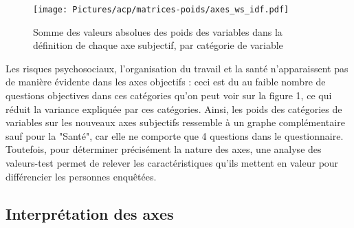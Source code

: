 \documentclass[11pt,fleqn,a4paper,openany,frenchb]{book} %
\begin{document}
\begin{figure}[!h]
  \centering
  \texttt{[image: Pictures/acp/matrices-poids/axes\_ws\_idf.pdf]}
  \caption{Somme des valeurs absolues des poids des variables dans la définition de chaque axe subjectif, par catégorie de variable}
  \label{fig:ACPsubj}
\end{figure}

Les risques psychosociaux, l'organisation du travail et la santé n'apparaissent pas de manière évidente dans les axes objectifs : ceci est du au faible nombre de questions objectives dans ces catégories qu'on peut voir sur la figure 1, ce qui réduit la variance expliquée par ces catégories. Ainsi, les poids des catégories de variables sur les nouveaux axes subjectifs ressemble à un graphe complémentaire sauf pour la "Santé", car elle ne comporte que 4 questions dans le questionnaire. Toutefois, pour déterminer précisément la nature des axes, une analyse des valeurs-test permet de relever les caractéristiques qu'ils mettent en valeur pour différencier les personnes enquêtées.%

\subsection{Interprétation des axes}
\end{document}
